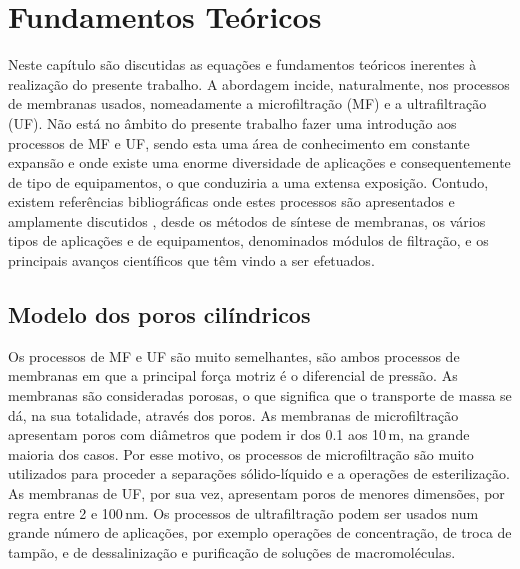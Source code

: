 \chapter{Fundamentos Teóricos}
\label{chap:teov3}
Neste capítulo são discutidas as equações e fundamentos teóricos inerentes à realização do presente trabalho. A abordagem incide, naturalmente, nos processos de membranas usados, nomeadamente a microfiltração (MF) e a ultrafiltração (UF). Não está no âmbito do presente trabalho fazer uma introdução aos processos de MF e UF, sendo esta uma área de conhecimento em constante expansão e onde existe uma enorme diversidade de aplicações e consequentemente de tipo de equipamentos, o que conduziria a uma extensa exposição. Contudo, existem referências bibliográficas onde estes processos são apresentados e amplamente discutidos \cite{mulder,rathore,reis,maurel}, desde os métodos de síntese de membranas, os vários tipos de aplicações e de equipamentos, denominados módulos de filtração, e os principais avanços científicos que têm vindo a ser efetuados. 

\section{Modelo dos poros cilíndricos}
\label{sec:cilindricos}
Os processos de MF e UF são muito semelhantes, são ambos processos de membranas em que a principal força motriz é o diferencial de pressão. As membranas são consideradas porosas, o que significa que o transporte de massa se dá, na sua totalidade, através dos poros. As membranas de microfiltração apresentam poros com diâmetros que podem ir dos 0.1 aos 10\,\micro m, na grande maioria dos casos. Por esse motivo, os processos de microfiltração são muito utilizados para proceder a separações sólido-líquido e a operações de esterilização. As membranas de UF, por sua vez, apresentam poros de menores dimensões, por regra entre 2 e 100\,nm. Os processos de ultrafiltração podem ser usados num grande número de aplicações, por exemplo operações de concentração, de troca de tampão, e de dessalinização e purificação de soluções de macromoléculas.  

